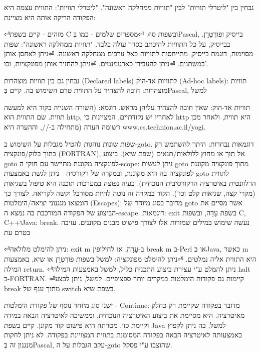         נבחין בין "ליטרלי תוויות" לבין "תוויות ממחלקה ראשונה".
        "ליטרלי תוויות": התווית עצמה היא הפקודה הריקה אותה היא מציינת:
        \begin{ציינון}
⏎מזהים - קיים בשפת C ובשפות סף.
⏎מספרים שלמים - כמו בְּPascal, בייסיק ופוֹרְטְרָן. בבייסיק, על כל התוויות להיכתב בסדר עולה בלבד.
        "תוויות ממחלקה ראשונה": שפות מסוימות, דוגמת בייסיק, מתייחסות לתוויות כאל ערכים ממחלקה ראשונה.
⏎ניתן לאחסן אותן במשתנים.
⏎ניתן להעבירן כארגומנטים.
⏎ניתן להחזיר אותן מפונקציות, וכו'.
      \end{ציינון}

        נבחין גם בין תוויות מוצהרות (Declared labels) לתוויות אד-הוק (Ad-hoc labels):
        תוויות מוצהרות: חובה להצהיר על התווית טרם השימוש בה. קיים בְּPascal, למשל

        תוויות אד-הוק:
        שאין חובה להצהיר עליהן מראש. דוגמא:
        (השורה השנייה בקוד היא למעשה תווית. שם התווית הוא http, לאחריו יש נקודתיים, המציינות כי http היא תווית, ולאחר מכן רשומה הערה (מתחילה ב-//, וההערה היא www.cs.technion.ac.il/yogi.

        שפות שונות נוהגות להטיל מגבלות על השימוש ב-goto. דוגמאות נבחרות: היתר להשתמש רק בתוך בלוק/פונקציה (FORTRAN), אל תוך או מחוץ ללולאות/תנאים (שפת שיא).
        ביצוע goto לפונקציה מקוננת מתיישר עם חוקי ה-scope: ניתן לעשות goto מתוך פונקציה מקוננת לפונקציה בה היא מקוננת, ובמקרה של רקורסיה - ניתן לגשת באמצעות goto לתווית הרלוונטית באיטרציה הרקורסיבית הנוכחית).
        בעיה נפוצה במערכות תוכנה היא טיפול בשגיאות (מקרי קצה, שגיאות קלט וכו'). הקוד במקרה זה נוטה להיות מסורבל וקשה לקריאה. לצורך כך הומצאו מנגנוני יציאה/הימלטות (Escapes): מדובר בסוג מיוחד של goto אשר מסיים את הביצוע של הפקודה המורכבת בה נמצא ה-escape. דוגמאות: exit בשפת עָדָה, ובשפות C, C++וJava: break. נעשה שימוש במילים שמורות אלו לצורך פישוט מבנים מקוננים.
        עזיבה בטרם עת
        \begin{ציינון}
⏎ניתן להימלט מלולאה: exit m ב-עָדָה, או לחילופין break m ב-Perl או בJava, כאשר m היא התווית אליה נמלטים.
⏎ניתן להימלט מפונקציה: למשל בשפות פוֹרְטְרָן או שיא, באמצעות המילה return.
⏎ניתן להמלט ע"י עצירת ביצוע התכנית כליל, למשל באמצעות המילה halt ב-FORTRAN.
⏎קיימות גם פקודות הימלטות במקרים יותר ספציפיים. למשל, ניתן לבצע break מתוך ענף של switch בשפת שיא.
      \end{ציינון}

        ישנו סוג מיוחד נוסף של פקודת הימלטות - Continue: מדובר בפקודה שקיימת רק כחלק מאיטרציה. היא מסיימת את ביצוע האיטרציה הנוכחית, וממשיכה לאיטרציה הבאה במידה וקיימת כזו. מטרתה היא פישוט קוד מקונן. קיים בשפת Java למשל, בה ניתן לקפוץ באמצעותה לאיטרציה הבאה בפקודה המסומנת בתווית המצויינת בפקודה. לא ניתן לחקות מנגנון זה בְּPascal, עקב הגבלות על ה-goto שהוצבו ע"י פסקל.

